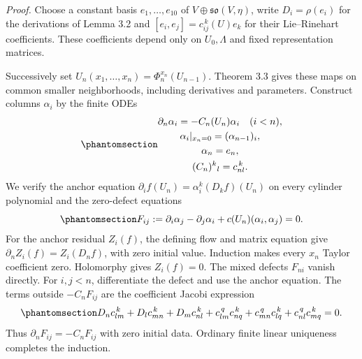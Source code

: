 \documentclass[
  english,
  11pt,
  reqno]{amsart}
\begin{document}
\emph{Proof.} Choose a constant basis \(e_1,\ldots,e_{10}\) of
\(V\oplus\mathfrak{so}(V,\eta)\), write \(D_i=\rho(e_i)\) for the
derivations of Lemma 3.2 and \([e_i,e_j]=c_{ij}^{\,k}(U)e_k\) for their
Lie--Rinehart coefficients. These coefficients depend only on
\(U_0,\Lambda\) and fixed representation matrices.

Successively set \(U_n(x_1,\ldots,x_n)=\Phi_n^{x_n}(U_{n-1})\). Theorem
3.3 gives these maps on common smaller neighborhoods, including
derivatives and parameters. Construct columns \(\alpha_i\) by the finite
ODEs
\begin{equation}\protect\phantomsection\label{eq:gg-finite-matrix-transport}{\begin{gathered}
\partial_n\alpha_i=-C_n(U_n)\alpha_i\quad(i<n), \\
\alpha_i|_{x_n=0}=(\alpha_{n-1})_i, \\
\alpha_n=e_n, \\
(C_n)^k{}_l=c_{nl}^{\,k}.
\end{gathered}}\end{equation} We verify the anchor equation
\(\partial_i f(U_n)=\alpha_i^k(D_kf)(U_n)\) on every cylinder polynomial
and the zero-defect equations
\begin{equation}\protect\phantomsection\label{eq:gg-coframe-defect}{
 F_{ij}:=\partial_i\alpha_j-\partial_j\alpha_i
              +c(U_n)(\alpha_i,\alpha_j)=0.
}\end{equation} For the anchor residual \(Z_i(f)\), the defining flow
and matrix equation give \(\partial_nZ_i(f)=Z_i(D_nf)\), with zero
initial value. Induction makes every \(x_n\) Taylor coefficient zero.
Holomorphy gives \(Z_i(f)=0\). The mixed defects \(F_{ni}\) vanish
directly. For \(i,j<n\), differentiate the defect and use the anchor
equation. The terms outside \(-C_nF_{ij}\) are the coefficient Jacobi
expression
\begin{equation}\protect\phantomsection\label{eq:gg-coefficient-jacobi}{
 D_nc_{lm}^{\,k}+D_lc_{mn}^{\,k}+D_mc_{nl}^{\,k}
 +c_{lm}^{\,q}c_{nq}^{\,k}
 +c_{mn}^{\,q}c_{lq}^{\,k}
 +c_{nl}^{\,q}c_{mq}^{\,k}=0.
}\end{equation} Thus \(\partial_nF_{ij}=-C_nF_{ij}\) with zero initial
data. Ordinary finite linear uniqueness completes the induction.
\end{document}
